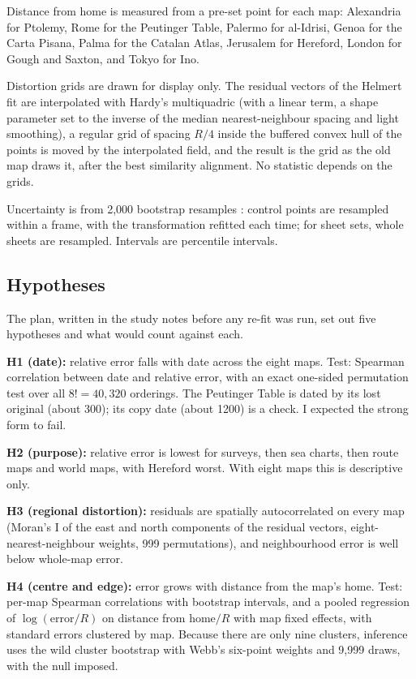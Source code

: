 \documentclass[11pt,a4paper]{article}
\begin{document}
Distance from home is measured from a pre-set point for each map: Alexandria for Ptolemy, Rome for the Peutinger Table, Palermo for al-Idrisi, Genoa for the Carta Pisana, Palma for the Catalan Atlas, Jerusalem for Hereford, London for Gough and Saxton, and Tokyo for Ino.

Distortion grids are drawn for display only. The residual vectors of the Helmert fit are interpolated with Hardy's multiquadric (with a linear term, a shape parameter set to the inverse of the median nearest-neighbour spacing and light smoothing), a regular grid of spacing $R/4$ inside the buffered convex hull of the points is moved by the interpolated field, and the result is the grid as the old map draws it, after the best similarity alignment. No statistic depends on the grids.

Uncertainty is from 2,000 bootstrap resamples \citep{efron1993}: control points are resampled within a frame, with the transformation refitted each time; for sheet sets, whole sheets are resampled. Intervals are percentile intervals.

\subsection{Hypotheses}
The plan, written in the study notes before any re-fit was run, set out five hypotheses and what would count against each.

\textbf{H1 (date):} relative error falls with date across the eight maps. Test: Spearman correlation between date and relative error, with an exact one-sided permutation test over all $8! = 40{,}320$ orderings. The Peutinger Table is dated by its lost original (about 300); its copy date (about 1200) is a check. I expected the strong form to fail.

\textbf{H2 (purpose):} relative error is lowest for surveys, then sea charts, then route maps and world maps, with Hereford worst. With eight maps this is descriptive only.

\textbf{H3 (regional distortion):} residuals are spatially autocorrelated on every map (Moran's I \citep{moran1950} of the east and north components of the residual vectors, eight-nearest-neighbour weights, 999 permutations), and neighbourhood error is well below whole-map error.

\textbf{H4 (centre and edge):} error grows with distance from the map's home. Test: per-map Spearman correlations with bootstrap intervals, and a pooled regression of $\log(\text{error}/R)$ on distance from home$/R$ with map fixed effects, with standard errors clustered by map. Because there are only nine clusters, inference uses the wild cluster bootstrap \citep{cameron2008} with Webb's six-point weights \citep{webb2023} and 9,999 draws, with the null imposed.
\end{document}
